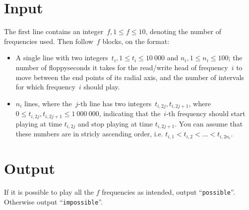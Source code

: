 \section*{Input}
The first line contains an integer~$f, 1 \leq f \leq 10$, denoting the number of frequencies used.
Then follow~$f$ blocks, on the format:
\begin{itemize}
  \item A single line with two integers~$t_i, 1\leq t_i \leq 10\ 000$ and $n_i, 1\leq n_i \leq 100$; the number of floppyseconds
  it takes for the read/write head of frequency~$i$ to move between the end points of its radial axis, and the number
  of intervals for which frequency~$i$ should play.
  \item $n_i$ lines, where the~$j$-th line has two integers~$t_{i,2j}, t_{i,2j+1}$, where $0\leq t_{i,2j},t_{i,2j+1} \leq 1\ 000\ 000$, indicating that the~$i$-th frequency should
  start playing at time $t_{i,2j}$ and stop playing at time $t_{i,2j+1}$. You can assume that these numbers are in stricly ascending order, i.e. 
  $t_{i,1} < t_{i,2} < \dots < t_{i, 2n_i}$. 

\end{itemize}

\section*{Output}
If it is possible to play all the $f$ frequencies as intended, output
``\texttt{possible}''. Otherwise output ``\texttt{impossible}''.

